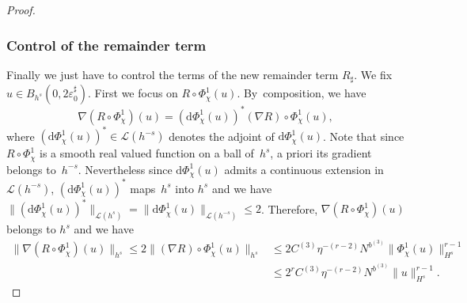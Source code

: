 \documentclass[JEP,XML,SOM,Unicode,NoEqCountersInSection,published]{cedram}
\theoremstyle{definition}
\begin{document}
\begin{proof}
\subsubsection*{Control of the remainder term}
Finally we just have to control the terms of the new remainder term $R_\sharp$. We fix $u\in B_{h^s}(0,2 \varepsilon_0^\sharp)$. First we focus on $R \circ \Phi_\chi^1(u)$. By~composition, we have
\[
\nabla (R \circ \Phi_\chi^1)(u) = (\mathrm{d}\Phi_\chi^1(u))^* (\nabla R) \circ \Phi_\chi^1(u),
\]
where $ (\mathrm{d}\Phi_\chi^1(u))^* \in \mathscr{L}(h^{-s})$ denotes the adjoint of $\mathrm{d}\Phi_\chi^1(u)$. Note that since $R \circ \Phi_\chi^1$ is a smooth real valued function on a ball of~$h^s$, a priori its gradient belongs to~$h^{-s}$. Nevertheless since $\mathrm{d}\Phi_\chi^1(u)$ admits a continuous extension in $\mathscr{L}(h^{-s})$, $(\mathrm{d}\Phi_\chi^1(u))^*$ maps~$h^s$ into $h^s$ and we have $\|(\mathrm{d}\Phi_\chi^1(u))^* \|_{\mathscr{L}(h^{s})} = \|\mathrm{d}\Phi_\chi^1(u) \|_{\mathscr{L}(h^{-s})} \leq 2$. Therefore, \hbox{$\nabla (R \circ \Phi_\chi^1)(u)$} belongs to $h^s$ and we have
\begin{equation*}
\begin{split}
\| \nabla (R \circ \Phi_\chi^1)(u) \|_{h^s} \leq 2 \| (\nabla R) \circ \Phi_\chi^1(u) \|_{h^s} &\leq 2 C^{(3)} \eta^{-(r-2)} N^{b^{(3)}} \|\Phi_\chi^1(u) \|_{H^s}^{r-1} \\
&\leq 2^r C^{(3)} \eta^{-(r-2)} N^{b^{(3)}} \| u \|_{H^s}^{r-1}.
\end{split}
\end{equation*}


\end{proof}
\end{document}
